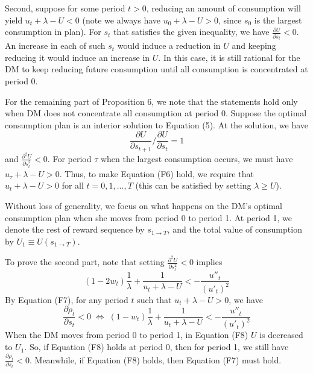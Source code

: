\documentclass[
  12pt,
]{article}
\begin{document}
Second, suppose for some period \(t>0\), reducing an amount of
consumption will yield \(u_t+\lambda-U< 0\) (note we always have
\(u_0+\lambda-U>0\), since \(s_0\) is the largest consumption in plan).
For \(s_t\) that satisfies the given inequality, we have
\(\frac{\partial U}{\partial s_t}<0\). An increase in each of such
\(s_t\) would induce a reduction in \(U\) and keeping reducing it would
induce an increase in \(U\). In this case, it is still rational for the
DM to keep reducing future consumption until all consumption is
concentrated at period 0.

For the remaining part of Proposition 6, we note that the statements
hold only when DM does not concentrate all consumption at period 0.
Suppose the optimal consumption plan is an interior solution to Equation
(5). At the solution, we have\[\tag{F6}
\frac{\partial U}{\partial s_{t+1}}/\frac{\partial U}{\partial s_{t}}=1
\]and \(\frac{\partial^2 U}{\partial s_t^2}<0\). For period \(\tau\)
when the largest consumption occurs, we must have
\(u_\tau +\lambda - U>0\). Thus, to make Equation (F6) hold, we require
that \(u_t +\lambda - U>0\) for all \(t=0,1,...,T\) (this can be
satisfied by setting \(\lambda \geq U\)).

Without loss of generality, we focus on what happens on the DM's optimal
consumption plan when she moves from period 0 to period 1. At period 1,
we denote the rest of reward sequence by \(s_{1 \rightarrow T}\), and
the total value of consumption by \(U_1\equiv U(s_{1\rightarrow T})\).

To prove the second part, note that setting
\(\frac{\partial^2 U}{\partial s_t^2}<0\) implies\[\tag{F7}
(1-2w_t)\frac{1}{\lambda} + \frac{1}{u_t+\lambda-U} < -\frac{u''_t}{(u'_t)^2} 
\]By Equation (F7), for any period \(t\) such that \(u_t+\lambda-U>0\),
we have\[\tag{F8}
\frac{\partial \rho_t}{\partial s_t}<0 \;\Longleftrightarrow\;
(1-w_t)\frac{1}{\lambda}+\frac{1}{u_t+\lambda-U}<-\frac{u''_t}{(u'_t)^2}
\]When the DM moves from period 0 to period 1, in Equation (F8) \(U\) is
decreased to \(U_1\). So, if Equation (F8) holds at period 0, then for
period 1, we still have \(\frac{\partial \rho_t}{\partial s_t}<0\).
Meanwhile, if Equation (F8) holds, then Equation (F7) must hold.
\end{document}

